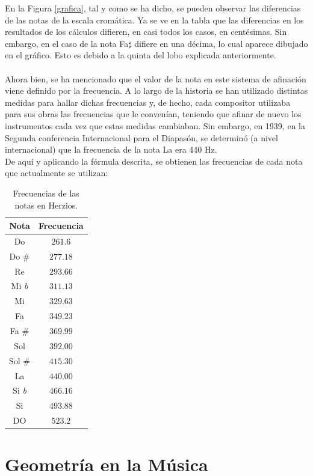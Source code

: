 \documentclass[a4paper, openright, 11pt, titlepage]{report}
\theoremstyle{definition}\newtheorem{defin}[propo]{Definition}
\theoremstyle{definition}\newtheorem{obser}[propo]{Remark}
\theoremstyle{definition}\newtheorem{ejem}[propo]{Ejemplo}
\theoremstyle{definition}\newtheorem{algoritmo}[propo]{Algoritmo}
\begin{document}
En la Figura \ref{grafica}, tal y como se ha dicho, se pueden observar las diferencias de las notas de la escala cromática. Ya se ve en la tabla que las diferencias en los resultados de los cálculos difieren, en casi todos los casos, en centésimas. Sin embargo, en el caso de la nota Fa$\sharp$ difiere en una décima, lo cual aparece dibujado en el gráfico. Esto es debido a la quinta del lobo explicada anteriormente. \\\\
Ahora bien, se ha mencionado que el valor de la nota en este sistema de afinación viene definido por la frecuencia. A lo largo de la historia se han utilizado distintas medidas para hallar dichas frecuencias y, de hecho, cada compositor utilizaba para sus obras las frecuencias que le convenían, teniendo que afinar de nuevo los instrumentos cada vez que estas medidas cambiaban. Sin embargo, en 1939, en la Segunda conferencia Internacional para el Diapasón, se determinó (a nivel internacional) que la frecuencia de la nota La era 440 Hz.\\
De aquí y aplicando la fórmula descrita, se obtienen las frecuencias de cada nota que actualmente se utilizan:
\begin{table}[H]
    \centering
    \begin{tabular}{|c|c|}
    \hline
    Nota & Frecuencia\\
    \hline \hline
       Do & $261.6$\\
       Do \# & $277.18$\\
       Re & $293.66$\\
       Mi \textit{b} & $311.13$\\
       Mi & $329.63$\\
       Fa & $349.23$\\
       Fa \# & $369.99$\\
       Sol & $392.00$\\
       Sol \# & $415.30$\\
       La & $440.00$\\
       Si \textit{b} & $466.16$\\
       Si & $493.88$\\
       DO & $523.2$\\
       \hline
    \end{tabular}
    \caption{Frecuencias de las notas en Herzios.}
\end{table}

\chapter{Geometría en la Música}
\end{document}
